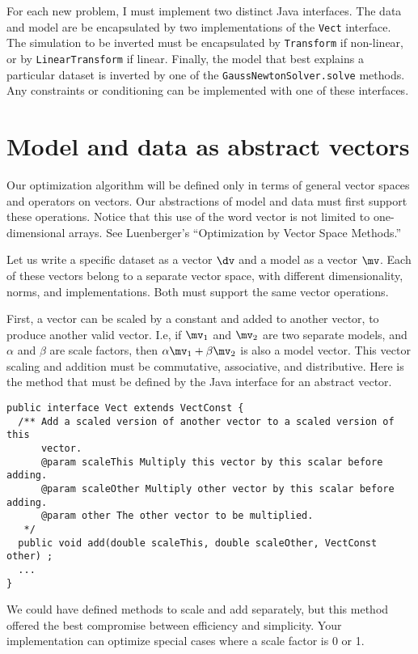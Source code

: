 \documentclass[12pt]{article}
\begin{document}
For each new problem, I must implement two
distinct Java interfaces.  The data and model
are be encapsulated by two implementations of
the \texttt{Vect} interface.  The simulation
to be inverted must be encapsulated by
\texttt{Transform} if non-linear, or by
\texttt{LinearTransform} if linear.  Finally,
the model that best explains a particular
dataset is inverted by one of the
\texttt{Gauss\-Newton\-Solver.solve} methods.
Any constraints or conditioning can be
implemented with one of these interfaces.

\section {Model and data as abstract vectors}

Our optimization algorithm will be defined
only in terms of general vector spaces and
operators on vectors.  Our abstractions of
model and data must first support these
operations.  Notice that this use of the word
vector is not limited to one-dimensional
arrays.  See Luenberger's
\cite{luenbergervec} ``Optimization by Vector
Space Methods.''

Let us write a specific dataset as a vector
$\dv$ and a model as a vector $\mv$.  Each of
these vectors belong to a separate vector
space, with different dimensionality, norms,
and implementations.  Both must support the
same vector operations.

First, a vector can be scaled by a constant
and added to another vector, to produce
another valid vector.  I.e, if $\mv_1$ and
$\mv_2$ are two separate models, and $\alpha$
and $\beta$ are scale factors, then $\alpha
\mv_1 + \beta \mv_2$ is also a model vector.
This vector scaling and addition must be
commutative, associative, and distributive.
Here is the method that must be defined by
the Java interface for an abstract vector.

{\footnotesize \begin{verbatim} 
public interface Vect extends VectConst {
  /** Add a scaled version of another vector to a scaled version of this
      vector.
      @param scaleThis Multiply this vector by this scalar before adding.
      @param scaleOther Multiply other vector by this scalar before adding.
      @param other The other vector to be multiplied.
   */
  public void add(double scaleThis, double scaleOther, VectConst other) ;
  ...
}
\end{verbatim}} 

\noindent We could have defined methods to
scale and add separately, but this method
offered the best compromise between
efficiency and simplicity.  Your
implementation can optimize special cases
where a scale factor is 0 or 1.
\end{document}
